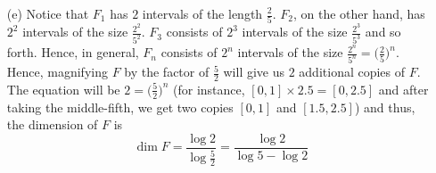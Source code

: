 \documentclass[11pt]{article}
\begin{document}
\begin{itemize}
\begin{itemize}
            \item[(e)]
                Notice that $F_1$ has $2$ intervals of the length
                $\frac{2}{5}$. $F_2$, on the other hand, has $2^2$ intervals of
                the size $\frac{2^2}{5^2}$. $F_3$ consists of $2^3$ intervals
                of the size $\frac{2^3}{5^3}$ and so forth. Hence, in general,
                $F_n$ consists of $2^n$ intervals of the size $\frac{2^n}{5^n}
                = \Big(\frac{2}{5}\Big)^n$. Hence, magnifying $F$ by the factor
                of $\frac{5}{2}$ will give us $2$ additional copies of $F$.
                The equation will be $2 = \Big(\frac{5}{2}\Big)^n$ (for
                instance, $[0 ,1] \times 2.5 = [0, 2.5]$ and after taking the
                middle-fifth, we get two copies $[0, 1]$ and $[1.5, 2.5]$) and
                thus, the dimension of $F$ is
                \begin{equation*}
                    \boxed{\dim{F} = \dfrac{\log{2}}{\log{\frac{5}{2}}} =
                    \dfrac{\log{2}}{\log{5} - \log{2}}}
                \end{equation*}
        \end{itemize}
    
    \newpage


\end{itemize}
\end{document}

